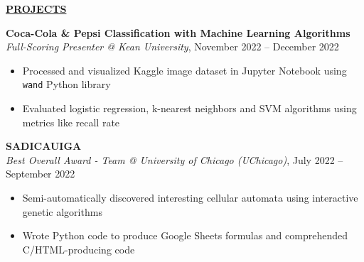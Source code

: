 \documentclass[
]{article}
\providecommand{\tightlist}{%
  \setlength{\itemsep}{0pt}\setlength{\parskip}{0pt}}
\begin{document}

\textbf{\underline{PROJECTS}}

\textbf{Coca-Cola \& Pepsi Classification with Machine Learning Algorithms} \\
\emph{Full-Scoring Presenter @ Kean University}, November 2022 -- December 2022

\begin{itemize}
\tightlist
\item
Processed and visualized Kaggle image dataset in Jupyter Notebook using \texttt{wand} Python library 
\end{itemize}

\begin{itemize}
\tightlist
\item
Evaluated logistic regression, k-nearest neighbors and SVM algorithms using metrics like recall rate  
\end{itemize}

\textbf{SADICAUIGA} \\
\emph{Best Overall Award - Team @ University of Chicago (UChicago)}, July 2022 -- September 2022 %
\begin{itemize}
\tightlist
\item
Semi-automatically discovered interesting cellular automata using interactive genetic algorithms
\end{itemize}

\begin{itemize}
\tightlist
\item
Wrote Python code to produce Google Sheets formulas and comprehended C/HTML-producing code
\end{itemize}





\end{document}
